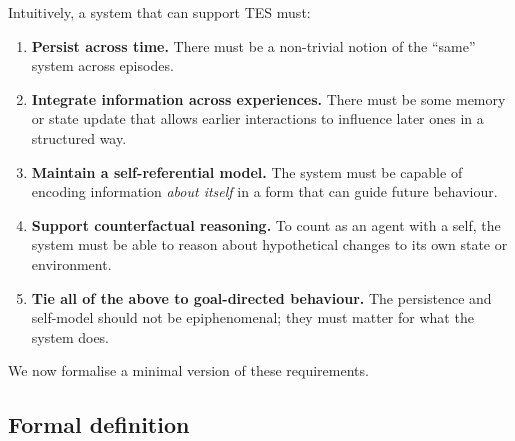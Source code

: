 \documentclass[11pt]{article}
\newcommand{\1}{\mathbf{1}}
\begin{document}
Intuitively, a system that can support TES must:

\begin{enumerate}[leftmargin=2em]
  \item \textbf{Persist across time.}
  There must be a non-trivial notion of the ``same'' system across episodes.

  \item \textbf{Integrate information across experiences.}
  There must be some memory or state update that allows earlier interactions
  to influence later ones in a structured way.

  \item \textbf{Maintain a self-referential model.}
  The system must be capable of encoding information \emph{about itself}
  in a form that can guide future behaviour.

  \item \textbf{Support counterfactual reasoning.}
  To count as an agent with a self, the system must be able to reason about
  hypothetical changes to its own state or environment.

  \item \textbf{Tie all of the above to goal-directed behaviour.}
  The persistence and self-model should not be epiphenomenal; they must
  matter for what the system does.
\end{enumerate}

We now formalise a minimal version of these requirements.

\subsection{Formal definition}
\end{document}
